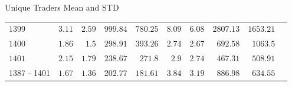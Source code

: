 \documentclass{beamer}
\begin{document}
\begin{frame}{Unique Traders Mean and STD}
\begin{tabular}{lrrrrrrrrr}
        \(\mathrm{1399}\)           & \(\mathrm{3.11}\)                              & \(\mathrm{2.59}\)                           & \(\mathrm{999.84}\)                            & \(\mathrm{780.25}\)                         & \(\mathrm{8.09}\) & \(\mathrm{6.08}\) & \(\mathrm{2807.13}\) & \(\mathrm{1653.21}\) \\
        \(\mathrm{1400}\)           & \(\mathrm{1.86}\)                              & \(\mathrm{1.5}\)                            & \(\mathrm{298.91}\)                            & \(\mathrm{393.26}\)                         & \(\mathrm{2.74}\) & \(\mathrm{2.67}\) & \(\mathrm{692.58}\)  & \(\mathrm{1063.5}\)  \\
        \(\mathrm{1401}\)           & \(\mathrm{2.15}\)                              & \(\mathrm{1.79}\)                           & \(\mathrm{238.67}\)                            & \(\mathrm{271.8}\)                          & \(\mathrm{2.9}\)  & \(\mathrm{2.74}\) & \(\mathrm{467.31}\)  & \(\mathrm{508.91}\)  \\
        \midrule
        1387 - 1401                 & \(\mathrm{1.67}\)                              & \(\mathrm{1.36}\)                           & \(\mathrm{202.77}\)                            & \(\mathrm{181.61}\)                         & \(\mathrm{3.84}\) & \(\mathrm{3.19}\) & \(\mathrm{886.98}\)  & \(\mathrm{634.55}\)  \\
        \bottomrule
    \end{tabular}
\end{frame}
\end{document}
